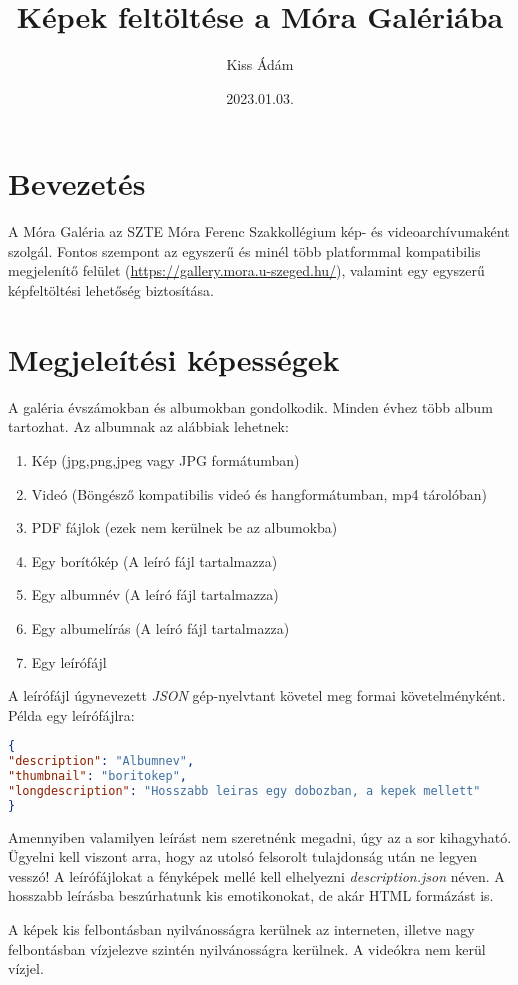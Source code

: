 ﻿\documentclass[12pt]{article}
\date{2023.01.03.}
\title{Képek feltöltése a Móra Galériába}
\author{Kiss Ádám}
\begin{document}
\maketitle
\tableofcontents

\section{Bevezetés}
A Móra Galéria az SZTE Móra Ferenc Szakkollégium kép- és videoarchívumaként szolgál. Fontos szempont az egyszerű és minél több platformmal kompatibilis megjelenítő felület (\url{https://gallery.mora.u-szeged.hu/}), valamint egy egyszerű képfeltöltési lehetőség biztosítása.

\section{Megjeleítési képességek}
A galéria évszámokban és albumokban gondolkodik. Minden évhez több album tartozhat. Az albumnak az alábbiak lehetnek:
\begin{enumerate}
\item Kép (jpg,png,jpeg vagy JPG formátumban)
\item Videó (Böngésző kompatibilis videó és hangformátumban, mp4 tárolóban)
\item PDF fájlok (ezek nem kerülnek be az albumokba)
\item Egy borítókép (A leíró fájl tartalmazza)
\item Egy albumnév (A leíró fájl tartalmazza)
\item Egy albumelírás (A leíró fájl tartalmazza)
\item Egy leírófájl
\end{enumerate}
A leírófájl úgynevezett \textit{JSON} gép-nyelvtant követel meg formai követelményként. Példa egy leírófájlra:

\begin{lstlisting}[language=json]
{
"description": "Albumnev",
"thumbnail": "boritokep",
"longdescription": "Hosszabb leiras egy dobozban, a kepek mellett"
}
\end{lstlisting}
Amennyiben valamilyen leírást nem szeretnénk megadni, úgy az a sor kihagyható. Ügyelni kell viszont arra, hogy az utolsó felsorolt tulajdonság után ne legyen vesszó! A leírófájlokat a fényképek mellé kell elhelyezni \textit{description.json} néven. A hosszabb leírásba beszúrhatunk kis emotikonokat, de akár HTML formázást is.

A képek kis felbontásban nyilvánosságra kerülnek az interneten, illetve nagy felbontásban vízjelezve szintén nyilvánosságra kerülnek. A videókra nem kerül vízjel.
\end{document}
